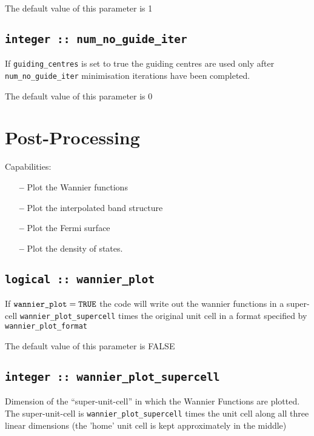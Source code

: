 The default value of this parameter is 1

\subsection[num\_no\_guide\_iter]{\tt integer :: num\_no\_guide\_iter}
If \verb#guiding_centres# is set to true the
guiding centres are used only after \verb#num_no_guide_iter#
minimisation iterations have been completed.

The default value of this parameter is 0



\section{Post-Processing}

 Capabilities:

\begin{itemize}
\item[{\bf --}]  Plot the Wannier functions
\item[{\bf --}]  Plot the interpolated band structure 		     
\item[{\bf --}]  Plot the Fermi surface 			     
\item[{\bf --}]  Plot the density of states.
\end{itemize}


\subsection[wannier\_plot]{\tt logical :: wannier\_plot}

If $\verb#wannier_plot#=\verb#TRUE#$ the code will write out the
wannier functions in a super-cell \verb#wannier_plot_supercell# times
the original unit cell in a format specified by \verb#wannier_plot_format#

The default value of this parameter is FALSE

\subsection[wannier\_plot\_supercell]{\tt integer :: wannier\_plot\_supercell}

Dimension of the ``super-unit-cell'' in which the Wannier Functions are plotted.
The super-unit-cell is \verb#wannier_plot_supercell# times the unit cell along all three
linear dimensions (the 'home' unit cell is kept approximately
in the middle)


